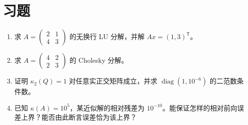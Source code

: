 \section{习题}
\begin{enumerate}[label=\arabic*.]
\item\label{exr:na-direct-lu} 求 $A=\begin{pmatrix}2&1\\4&3\end{pmatrix}$ 的无换行 LU 分解，并解 $Ax=(1,3)^{\mathsf T}$。
\item\label{exr:na-direct-cholesky} 求 $A=\begin{pmatrix}4&2\\2&3\end{pmatrix}$ 的 Cholesky 分解。
\item\label{exr:na-direct-condition} 证明 $\kappa_2(Q)=1$ 对任意实正交矩阵成立，并求 $\operatorname{diag}(1,10^{-6})$ 的二范数条件数。
\item\label{exr:na-direct-residual} 已知 $\kappa(A)=10^5$，某近似解的相对残差为 $10^{-10}$。能保证怎样的相对前向误差上界？能否由此断言误差恰为该上界？
\end{enumerate}

